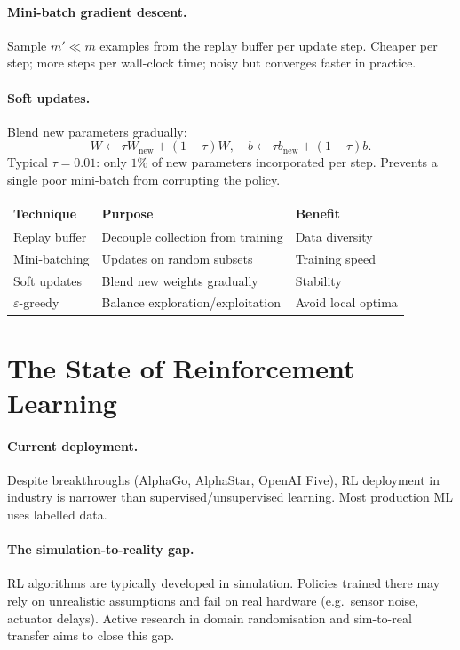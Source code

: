 \paragraph{Mini-batch gradient descent.}
Sample $m'\ll m$ examples from the replay buffer per update step. Cheaper per
step; more steps per wall-clock time; noisy but converges faster in practice.

\paragraph{Soft updates.}
Blend new parameters gradually:
\[W\leftarrow\tau W_{\text{new}}+(1-\tau)W,\quad
  b\leftarrow\tau b_{\text{new}}+(1-\tau)b.\]
Typical $\tau=0.01$: only $1\%$ of new parameters incorporated per step.
Prevents a single poor mini-batch from corrupting the policy.

\begin{center}
\begin{tabular}{lll}
\toprule
\textbf{Technique} & \textbf{Purpose} & \textbf{Benefit}\\
\midrule
Replay buffer    & Decouple collection from training & Data diversity\\
Mini-batching    & Updates on random subsets & Training speed\\
Soft updates     & Blend new weights gradually & Stability\\
$\varepsilon$-greedy & Balance exploration/exploitation & Avoid local optima\\
\bottomrule
\end{tabular}
\end{center}

\section{The State of Reinforcement Learning}

\paragraph{Current deployment.}
Despite breakthroughs (AlphaGo, AlphaStar, OpenAI Five), RL deployment in
industry is narrower than supervised/unsupervised learning. Most production ML
uses labelled data.

\paragraph{The simulation-to-reality gap.}
RL algorithms are typically developed in simulation. Policies trained there may
rely on unrealistic assumptions and fail on real hardware (e.g.\ sensor noise,
actuator delays). Active research in domain randomisation and sim-to-real
transfer aims to close this gap.

